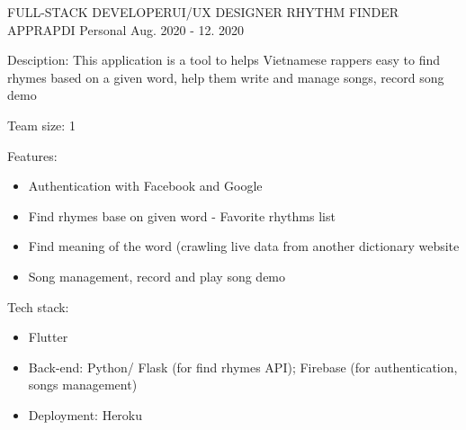 \begin{cventries}

  \cventry
    {FULL-STACK DEVELOPER{\enskip\cdotp\enskip}UI/UX DESIGNER} %
    {RHYTHM FINDER APP{\enskip\cdotp\enskip}RAPDI} %
    {Personal} %
    {Aug. 2020 - 12. 2020} %
    {
      \begin{cvitems} %
        \item {Desciption: This application is a tool to helps Vietnamese rappers easy to find rhymes based on a given word, help them write and manage songs, record song demo}
        \item {Team size: 1}
        \item {Features:}
            \begin{itemize}
                \item {Authentication with Facebook and Google}
                \item {Find rhymes base on given word - Favorite rhythms list}
                \item {Find meaning of the word (crawling live data from another dictionary website}
                \item {Song management, record and play song demo}
            \end{itemize}
        \item {Tech stack: }
            \begin{itemize}
                \item {Flutter}
                \item {Back-end: Python/ Flask (for find rhymes API); Firebase (for authentication, songs management)}
                \item {Deployment: Heroku}
            \end{itemize}
      \end{cvitems}
    }
\end{cventries}